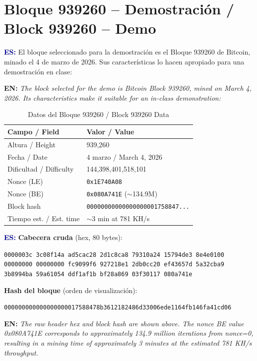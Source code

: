 \documentclass[12pt,a4paper]{article}
\newcommand{\es}[1]{\foreignlanguage{spanish}{#1}}
\newcommand{\en}[1]{\foreignlanguage{english}{#1}}
\newcommand{\bsection}[2]{%
    \section{#1 \textnormal{\normalsize\color{accentblue}/ #2}}%
}
\newenvironment{bilingual}{%
    \par\medskip
}{%
    \par\medskip
}
\newcommand{\espara}[1]{\noindent\textcolor{darkblue}{\textbf{ES:}} #1\par\smallskip}
\newcommand{\enpara}[1]{\noindent\textcolor{accentblue}{\textbf{EN:}} \textit{#1}\par\smallskip}
\begin{document}
\bsection{Bloque 939260 -- Demostraci\'on}{Block 939260 -- Demo}

\begin{bilingual}
\espara{%
El bloque seleccionado para la demostraci\'on es el Bloque 939260 de Bitcoin,
minado el 4 de marzo de 2026. Sus caracter\'isticas lo hacen apropiado para
una demostraci\'on en clase:}

\enpara{%
The block selected for the demo is Bitcoin Block 939260, mined on March 4, 2026.
Its characteristics make it suitable for an in-class demonstration:}
\end{bilingual}

\begin{table}[h]
    \centering
    \caption{\es{Datos del Bloque 939260} / \en{Block 939260 Data}}
    \begin{tabular}{@{}ll@{}}
        \toprule
        \textbf{\es{Campo} / \en{Field}} & \textbf{\es{Valor} / \en{Value}} \\
        \midrule
        \es{Altura} / \en{Height}                & 939,260 \\
        \es{Fecha} / \en{Date}                    & 4 marzo / March 4, 2026 \\
        \es{Dificultad} / \en{Difficulty}         & 144,398,401,518,101 \\
        Nonce (LE)                                & \texttt{0x1E740A08} \\
        Nonce (BE)                                & \texttt{0x080A741E} ($\sim$134.9M) \\
        Block hash                                & \texttt{00000000000000000001758847...} \\
        \es{Tiempo est.} / \en{Est. time}         & $\sim$3 min at 781 KH/s \\
        \bottomrule
    \end{tabular}
\end{table}

\begin{bilingual}
\espara{%
\textbf{Cabecera cruda} (hex, 80 bytes):

\texttt{\small 0000003c 3c08f14a ad5cac28 2d1c8ca8 79310a24 15794de3 8e4e0100}
\texttt{\small 00000000 00000000 fc9099f6 927218e1 2db0cc20 ef43657d 5a32cba9}
\texttt{\small 3b8994ba 59a61054 ddf1af1b bf28a869 03f30117 080a741e}

\textbf{Hash del bloque} (orden de visualizaci\'on):

\texttt{\small 000000000000000000017588478b3612182486d33006ede1164fb146fa41cd06}}

\enpara{%
The raw header hex and block hash are shown above. The nonce BE value
0x080A741E corresponds to approximately 134.9 million iterations from
nonce=0, resulting in a mining time of approximately 3 minutes at the
estimated 781 KH/s throughput.}
\end{bilingual}
\end{document}

